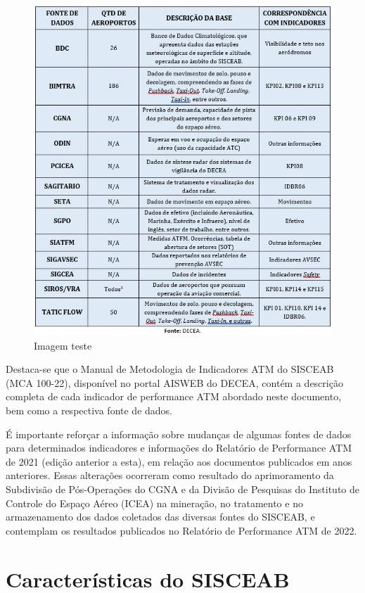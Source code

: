 \documentclass[
]{book}
\theoremstyle{definition}
\theoremstyle{definition}
\theoremstyle{definition}
\theoremstyle{definition}
\theoremstyle{remark}
\begin{document}
\begin{figure}
\centering
\includegraphics{imagens/fig9.jpg}
\caption{Imagem teste}
\end{figure}

Destaca-se que o Manual de Metodologia de Indicadores ATM do SISCEAB (MCA 100-22), disponível no portal AISWEB do DECEA, contém a descrição completa de cada indicador de performance ATM abordado neste documento, bem como a respectiva fonte de dados.

É importante reforçar a informação sobre mudanças de algumas fontes de dados para determinados indicadores e informações do Relatório de Performance ATM de 2021 (edição anterior a esta), em relação aos documentos publicados em anos anteriores. Essas alterações ocorreram como resultado do aprimoramento da Subdivisão de Pós-Operações do CGNA e da Divisão de Pesquisas do Instituto de Controle do Espaço Aéreo (ICEA) na mineração, no tratamento e no armazenamento dos dados coletados das diversas fontes do SISCEAB, e contemplam os resultados publicados no Relatório de Performance ATM de 2022.

\hypertarget{cross}{%
\chapter{Características do SISCEAB}\label{cross}}
\end{document}
